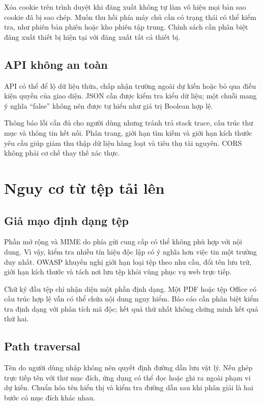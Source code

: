 Xóa cookie trên trình duyệt khi đăng xuất không tự làm vô hiệu mọi bản sao cookie đã bị sao chép. Muốn thu hồi phía máy chủ cần có trạng thái có thể kiểm tra, như phiên bản phiên hoặc kho phiên tập trung. Chính sách cần phân biệt đăng xuất thiết bị hiện tại với đăng xuất tất cả thiết bị.
\subsection{API không an toàn}
API có thể để lộ dữ liệu thừa, chấp nhận trường ngoài dự kiến hoặc bỏ qua điều kiện quyền của giao diện. JSON cần được kiểm tra kiểu dữ liệu; một chuỗi mang ý nghĩa ``false'' không nên được tự hiểu như giá trị Boolean hợp lệ.

Thông báo lỗi cần đủ cho người dùng nhưng tránh trả stack trace, cấu trúc thư mục và thông tin kết nối. Phân trang, giới hạn tìm kiếm và giới hạn kích thước yêu cầu giúp giảm thu thập dữ liệu hàng loạt và tiêu thụ tài nguyên. CORS không phải cơ chế thay thế xác thực.

\section{Nguy cơ từ tệp tải lên}
\subsection{Giả mạo định dạng tệp}
Phần mở rộng và MIME do phía gửi cung cấp có thể không phù hợp với nội dung. Vì vậy, kiểm tra nhiều tín hiệu độc lập có ý nghĩa hơn việc tin một trường duy nhất. OWASP khuyến nghị giới hạn loại tệp theo nhu cầu, đổi tên lưu trữ, giới hạn kích thước và tách nơi lưu tệp khỏi vùng phục vụ web trực tiếp.\cite{upload}

Chữ ký đầu tệp chỉ nhận diện một phần định dạng. Một PDF hoặc tệp Office có cấu trúc hợp lệ vẫn có thể chứa nội dung nguy hiểm. Báo cáo cần phân biệt kiểm tra định dạng với phân tích mã độc; kết quả thứ nhất không chứng minh kết quả thứ hai.
\subsection{Path traversal}
Tên do người dùng nhập không nên quyết định đường dẫn lưu vật lý. Nếu ghép trực tiếp tên với thư mục đích, ứng dụng có thể đọc hoặc ghi ra ngoài phạm vi dự kiến. Chuẩn hóa tên hiển thị và kiểm tra đường dẫn sau khi phân giải là hai bước có mục đích khác nhau.

